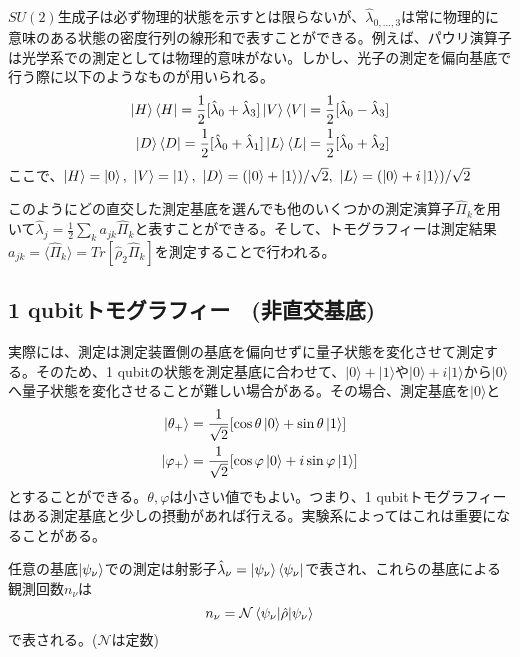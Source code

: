 \documentclass[11pt,a4j,notitlepage]{jreport}
\begin{document}
	$SU(2)$生成子は必ず物理的状態を示すとは限らないが、$\hat{\lambda}_{0,...,3}$は常に物理的に意味のある状態の密度行列の線形和で表すことができる。例えば、パウリ演算子は光学系での測定としては物理的意味がない。しかし、光子の測定を偏向基底で行う際に以下のようなものが用いられる。
	\begin{equation}
		\begin{aligned}
			\ket{H} \bra{H} = \frac{1}{2}[\hat{\lambda}_0 + \hat{\lambda}_3] \ket{V} \bra{V} = \frac{1}{2}[\hat{\lambda}_0 - \hat{\lambda}_3]\\
			\ket{D} \bra{D} = \frac{1}{2}[\hat{\lambda}_0 + \hat{\lambda}_1] \ket{L} \bra{L} = \frac{1}{2}[\hat{\lambda}_0 + \hat{\lambda}_2]
		\end{aligned}
	\end{equation}
	ここで、$\ket{H} = \ket{0}, \ \ket{V} = \ket{1}, \ \ket{D} = (\ket{0} + \ket{1}) / \sqrt{2} , \ \ket{L} = (\ket{0} + i\ket{1}) / \sqrt{2}$

	このようにどの直交した測定基底を選んでも他のいくつかの測定演算子$\hat{\Pi}_k$を用いて$\hat{\lambda}_j = \frac{1}{2} \sum_{k} a_{jk} \hat{\Pi}_k$と表すことができる。そして、トモグラフィーは測定結果$a_{jk} = \langle \hat{\Pi}_k \rangle = Tr[\hat{\rho}_2 \hat{\Pi}_k]$を測定することで行われる。

	\subsection{1 qubitトモグラフィー　(非直交基底)}

	実際には、測定は測定装置側の基底を偏向せずに量子状態を変化させて測定する。そのため、1 qubitの状態を測定基底に合わせて、$| 0 \rangle + | 1 \rangle$や$| 0 \rangle + i | 1 \rangle$から$| 0 \rangle$へ量子状態を変化させることが難しい場合がある。その場合、測定基底を$| 0 \rangle$と
	\begin{equation}
		\begin{aligned}
			\ket{\theta_+} &= \frac{1}{\sqrt{2}} [\cos \theta \ket{0} + \sin \theta \ket{1}]\\
			\ket{\varphi_+} &= \frac{1}{\sqrt{2}} [\cos \varphi \ket{0} + i \sin \varphi \ket{1}]
		\end{aligned}
	\end{equation}
	とすることができる。$\theta, \varphi$は小さい値でもよい。つまり、1 qubitトモグラフィーはある測定基底と少しの摂動があれば行える。実験系によってはこれは重要になることがある。

	任意の基底$\ket{\psi_\nu}$での測定は射影子$\hat{\lambda}_\nu = \ket{\psi_\nu} \bra{\psi_\nu}$で表され、これらの基底による観測回数$n_\nu$は
	\begin{equation}
		n_\nu = \mathcal{N} \braket{\psi_\nu | \hat{\rho} | \psi_\nu}
	\end{equation}
	で表される。($\mathcal{N}$は定数)
\end{document}
